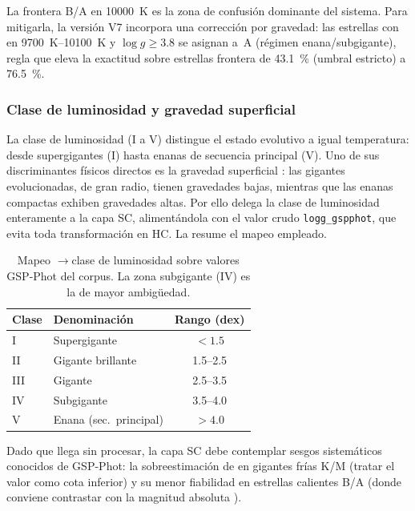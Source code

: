 La frontera B/A en \SI{10000}{\kelvin} es la zona de confusión dominante del
sistema. Para mitigarla, la versión V7 incorpora una corrección por gravedad: las
estrellas con \teff{} en \SIrange{9700}{10100}{\kelvin} y $\log g \ge 3.8$ se
asignan a~A (régimen enana/subgigante), regla que eleva la exactitud sobre
estrellas frontera de \SI{43.1}{\percent} (umbral \teff{} estricto) a
\SI{76.5}{\percent}.

\subsubsection{Clase de luminosidad y gravedad superficial}
\label{sec:fund-lum}

La clase de luminosidad (I a V) distingue el estado evolutivo a igual temperatura:
desde supergigantes (I) hasta enanas de secuencia principal (V). Uno de sus 
discriminantes físicos directos es la gravedad superficial \logg{}: las gigantes 
evolucionadas, de gran radio, tienen gravedades bajas, mientras que las enanas 
compactas exhiben gravedades altas. Por ello \STELLAR{} delega la clase de 
luminosidad enteramente a la capa SC, alimentándola con el valor crudo 
\verb|logg_gspphot|, que evita toda transformación en HC. La  
resume el mapeo empleado.

\begin{table}[H]
  \centering
  \caption{Mapeo \logg{}$\rightarrow$clase de luminosidad sobre valores GSP-Phot
  del corpus. La zona subgigante (IV) es la de mayor ambigüedad.}
  \label{tab:logg-lum}
  \begin{tabular}{llc}
    \toprule
    Clase & Denominación & Rango \logg{} (dex) \\
    \midrule
    I   & Supergigante          & $< 1.5$ \\
    II  & Gigante brillante     & \numrange{1.5}{2.5} \\
    III & Gigante               & \numrange{2.5}{3.5} \\
    IV  & Subgigante            & \numrange{3.5}{4.0} \\
    V   & Enana (sec.\ principal) & $> 4.0$ \\
    \bottomrule
  \end{tabular}
\end{table}

Dado que \logg{} llega sin procesar, la capa SC debe contemplar sesgos
sistemáticos conocidos de GSP-Phot: la sobreestimación de \logg{} en gigantes
frías K/M (tratar el valor como cota inferior) y su menor fiabilidad en estrellas
calientes B/A (donde conviene contrastar con la magnitud absoluta \MG{}).

